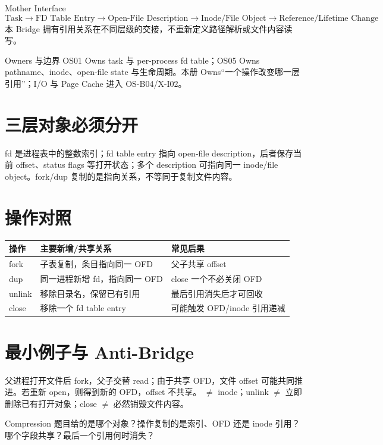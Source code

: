 \documentclass[UTF8,fontset=none,11pt,a4paper]{ctexart}
\begin{document}
\begin{corebox}{Mother Interface}
\[
\boxed{\text{Task}\to\text{FD Table Entry}\to\text{Open-File Description}\to\text{Inode/File Object}\to\text{Reference/Lifetime Change}}
\]
本 Bridge 拥有引用关系在不同层级的交接，不重新定义路径解析或文件内容读写。
\end{corebox}
\begin{methodbox}{Owners 与边界}
OS01 Owns task 与 per-process fd table；OS05 Owns pathname、inode、open-file state 与生命周期。本册 Owns“一个操作改变哪一层引用”；I/O 与 Page Cache 进入 OS-B04/X-I02。
\end{methodbox}
\section{三层对象必须分开}
fd 是进程表中的整数索引；fd table entry 指向 open-file description，后者保存当前 offset、status flags 等打开状态；多个 description 可指向同一 inode/file object。fork/dup 复制的是指向关系，不等同于复制文件内容。
\section{操作对照}
\begin{center}\small\begin{tabularx}{\linewidth}{lXX}\toprule 操作&主要新增/共享关系&常见后果\\\midrule fork&子表复制，条目指向同一 OFD&父子共享 offset\\ dup&同一进程新增 fd，指向同一 OFD&close 一个不必关闭 OFD\\ unlink&移除目录名，保留已有引用&最后引用消失后才可回收\\ close&移除一个 fd table entry&可能触发 OFD/inode 引用递减\\\bottomrule\end{tabularx}\end{center}
\section{最小例子与 Anti-Bridge}
父进程打开文件后 fork，父子交替 read；由于共享 OFD，文件 offset 可能共同推进。若重新 open，则得到新的 OFD，offset 不共享。 $\neq$ inode；unlink $\neq$ 立即删除已有打开对象；close $\neq$ 必然销毁文件内容。
\begin{corebox}{Compression}
题目给的是哪个对象？操作复制的是索引、OFD 还是 inode 引用？哪个字段共享？最后一个引用何时消失？
\end{corebox}
\end{document}
